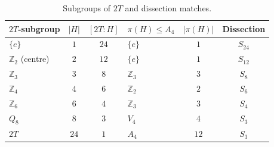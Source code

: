 \documentclass[11pt,a4paper]{article}
\theoremstyle{plain}
\theoremstyle{definition}
\theoremstyle{remark}
\newcommand{\Z}{\mathbb{Z}}
\begin{document}
\begin{table}[!t]
\centering\small
\caption{Subgroups of $2T$ and dissection matches.}
\label{tab:2T-lattice}
\begin{tabular}{@{} l c c l c c @{}}
\toprule
$2T$-subgroup & $|H|$ & $[2T:H]$ & $\pi(H) \leq A_{4}$ & $|\pi(H)|$ & Dissection \\
\midrule
$\{e\}$             & $1$  & $24$ & $\{e\}$      & $1$ & $S_{24}$ \\
$\Z_{2}$ (centre)    & $2$  & $12$ & $\{e\}$      & $1$ & $S_{12}$ \\
$\Z_{3}$            & $3$  & $8$  & $\Z_{3}$     & $3$ & $S_{8}$  \\
$\Z_{4}$            & $4$  & $6$  & $\Z_{2}$     & $2$ & $S_{6}$  \\
$\Z_{6}$            & $6$  & $4$  & $\Z_{3}$     & $3$ & $S_{4}$  \\
$Q_{8}$             & $8$  & $3$  & $V_{4}$      & $4$ & $S_{3}$  \\
$2T$                & $24$ & $1$  & $A_{4}$      & $12$& $S_{1}$  \\
\bottomrule
\end{tabular}
\end{table}
\end{document}
